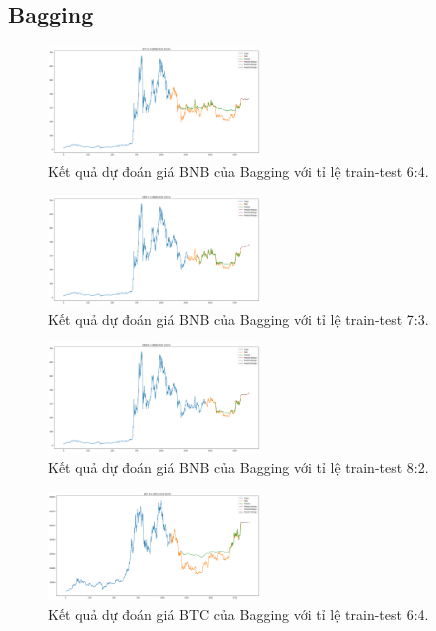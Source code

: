 \documentclass{ieeeojies}
\begin{document}
\subsection{Bagging}
\begin{figure}[h]
    \centering
    \includegraphics[width=0.5\textwidth]{bibliography/pictures/1.png}
    \caption{Kết quả dự đoán giá BNB của Bagging với tỉ lệ train-test 6:4.}
\end{figure}
\begin{figure}[h]
    \centering
    \includegraphics[width=0.5\textwidth]{bibliography/pictures/2.png}
    \caption{Kết quả dự đoán giá BNB của Bagging với tỉ lệ train-test 7:3.}
\end{figure}
\begin{figure}[h]
    \centering
    \includegraphics[width=0.5\textwidth]{bibliography/pictures/3.png}
    \caption{Kết quả dự đoán giá BNB của Bagging với tỉ lệ train-test 8:2.}
\end{figure}
\begin{figure}[h]
    \centering
    \includegraphics[width=0.5\textwidth]{bibliography/pictures/4.png}
    \caption{Kết quả dự đoán giá BTC của Bagging với tỉ lệ train-test 6:4.}
\end{figure}
\end{document}
